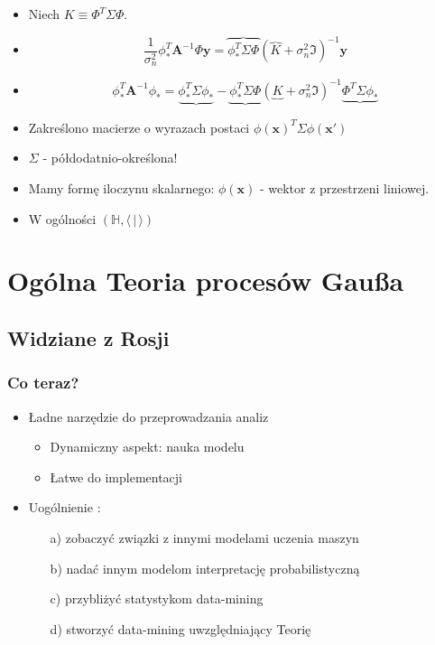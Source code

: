 \documentclass[draft, xetex]{beamer}
\newcommand{\xxx}{\mathbf{x}}
\newcommand{\yyy}{\mathbf{y}}
\newcommand{\A}{\mathbf{A}}
\begin{document}
\begin{frame}
	\begin{itemize}
		\item Niech $K \equiv \Phi^T \Sigma \Phi$. 
		\item $$\frac{1}{\sigma_n^2} \phi_*^T \A^{-1} \Phi \yyy = \overbrace{\phi_*^T \Sigma \Phi} (\overbrace{K} + \sigma^2_n \mathfrak{I})^{-1} \yyy$$
		\item $$\phi_*^T \A^{-1} \phi_* = \underbrace{\phi_*^T \Sigma \phi_*} - \underbrace{\phi_*^T \Sigma \Phi} (\underbrace{K} + \sigma^2_n \mathfrak{I})^{-1} \underbrace{\Phi^T \Sigma \phi_*}$$
		\item Zakreślono macierze o wyrazach postaci $\phi( \xxx )^T \Sigma \phi( \xxx ' )$
		\item $\Sigma$ - półdodatnio-określona!
		\item Mamy formę iloczynu skalarnego: $\phi(\xxx)$ - wektor z przestrzeni liniowej.
		\item W ogólności $(\mathbb{H}, \langle \, |\, \rangle)$
	\end{itemize}
\end{frame}



\section[Gau\ss]{Ogólna Teoria procesów Gau\ss a}

\subsection{Widziane z Rosji}

\begin{frame}
	\frametitle{Co teraz?}
	\begin{itemize}
		\item Ładne narzędzie do przeprowadzania analiz
		\begin{itemize}
			\item Dynamiczny aspekt: nauka modelu
			\item Łatwe do implementacji
		\end{itemize}
		\item Uogólnienie : 
		\begin{itemize}
		\item[a)] zobaczyć związki z innymi modelami uczenia maszyn
		\item[b)] nadać innym modelom interpretację probabilistyczną
		\item[c)] przybliżyć statystykom data-mining
		\item[d)] stworzyć data-mining uwzględniający Teorię
		\end{itemize}
	\end{itemize}
\end{frame}
\end{document}
